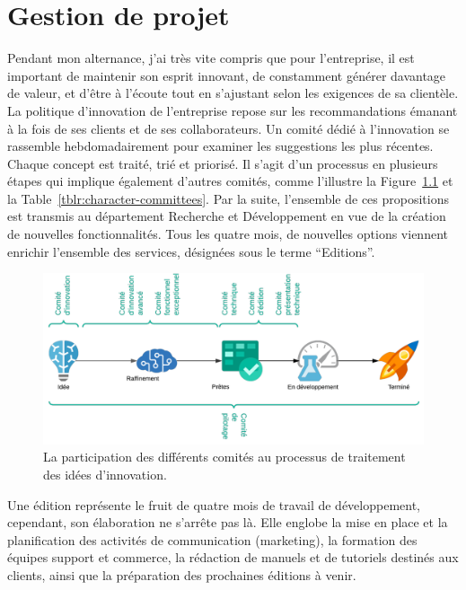 \chapter{Gestion de projet}\label{ch:gestion-projet}

Pendant mon alternance, j'ai très vite compris que pour l'entreprise, il est important de maintenir son esprit innovant, de constamment générer davantage de valeur, et d'être à l'écoute tout en s'ajustant selon les exigences de sa clientèle. La politique d'innovation de l'entreprise repose sur les recommandations émanant à la fois de ses clients et de ses collaborateurs. Un comité dédié à l'innovation se rassemble hebdomadairement pour examiner les suggestions les plus récentes. Chaque concept est traité, trié et priorisé. Il s'agit d'un processus en plusieurs étapes qui implique également d'autres comités, comme l'illustre la Figure~\ref{fig:committees} et la Table~\ref{tblr:character-committees}. Par la suite, l'ensemble de ces propositions est transmis au département Recherche et Développement en vue de la création de nouvelles fonctionnalités. Tous les quatre mois, de nouvelles options viennent enrichir l'ensemble des services, désignées sous le terme \foreignquote{french}{Editions}.

\begin{figure}[ht]
    \centering
    \includegraphics[width=\textwidth]{img/committees}
    \caption{La participation des différents comités au processus de traitement des idées d'innovation.}
    \label{fig:committees}
\end{figure}

Une édition représente le fruit de quatre mois de travail de développement, cependant, son élaboration ne s'arrête pas là. Elle englobe la mise en place et la planification des activités de communication (marketing), la formation des équipes support et commerce, la rédaction de manuels et de tutoriels destinés aux clients, ainsi que la préparation des prochaines éditions à venir.

